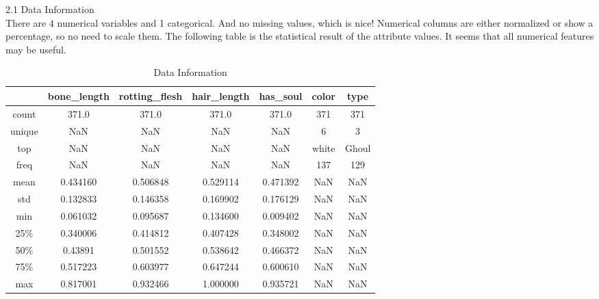2.1 Data Information\\
\hspace*{0.4cm}There are 4 numerical variables and 1 categorical. And no missing values, which is nice! Numerical columns are either normalized or show a percentage, so no need to scale them. The following table is the statistical result of the attribute values.
It seems that all numerical features may be useful.\\
\begin{table}[h]  \centering
	\caption{Data Information}
	\label{tbl:data information}
	\begin{tabular}{ccccccc}
		\hline
		& bone_length & rotting_flesh & hair_length & has_soul & color & type\\
		\hline
		count & 371.0 & 371.0 & 371.0 & 371.0 & 371 & 371 \\
		unique & NaN & NaN & NaN & NaN & 6 & 3 \\
		top & NaN & NaN & NaN & NaN & white & Ghoul \\
		freq & NaN & NaN & NaN & NaN & 137 & 129\\
		mean & 0.434160 & 0.506848 & 0.529114 & 0.471392 & NaN & NaN \\
		std & 0.132833 & 0.146358 & 0.169902 & 0.176129 & NaN & NaN \\
		min & 0.061032 & 0.095687 & 0.134600 & 0.009402 & NaN & NaN \\
		25\% & 0.340006 & 0.414812 & 0.407428 & 0.348002 & NaN & NaN \\
		50\% & 0.43891 & 0.501552 & 0.538642 & 0.466372 & NaN & NaN\\
		75\% & 0.517223 & 0.603977 & 0.647244 & 0.600610 & NaN & NaN\\
		max &  0.817001 & 0.932466 & 1.000000 & 0.935721 & NaN & NaN\\
		\hline 
	\end{tabular}
\end{table}


